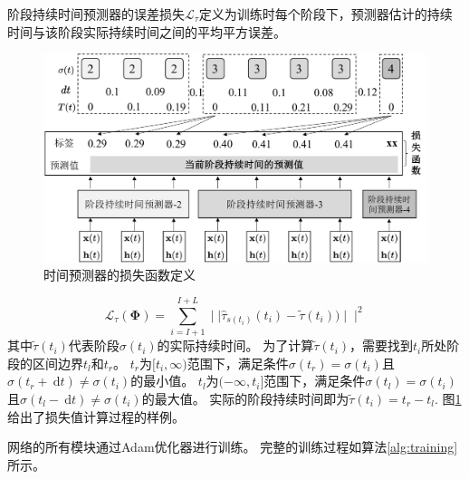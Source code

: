 阶段持续时间预测器的误差损失$\mathcal{L}_{\tau}$定义为训练时每个阶段下，预测器估计的持续时间与该阶段实际持续时间之间的平均平方误差。

\begin{figure}
    \centering
    \includegraphics[width=0.8\linewidth]{figures/chapter4/dt_label.pdf}
    \caption{时间预测器的损失函数定义}
    \label{fig:dt_label}
\end{figure}
\begin{equation}
    \mathcal{L}_{\tau}(\boldsymbol \Phi) =\sum_{i=I+1}^{I+L} \mid\mid\hat{\tau}_{s(t_i) }(t_i)-\tilde {\tau}(t_i))\mid\mid^2
\end{equation}
其中$\tilde {\tau}(t_i)$代表阶段$\sigma(t_i)$的实际持续时间。
为了计算$\tilde {\tau}(t_i)$，需要找到$t_i$所处阶段的区间边界$t_l$和$t_r$。
$t_r$为$[t_i, \infty)$范围下，满足条件$\sigma(t_r)=\sigma(t_i)$且$\sigma(t_r+\mathrm{~d}t)\neq \sigma(t_i)$的最小值。
$t_l$为$(-\infty, t_i]$范围下，满足条件$\sigma(t_l)=\sigma(t_i)$且$\sigma(t_l-\mathrm{~d}t)\neq \sigma(t_i)$的最大值。
实际的阶段持续时间即为$\tilde {\tau}(t_i)=t_r-t_l$.
图\ref{fig:dt_label}给出了损失值计算过程的样例。

网络的所有模块通过Adam优化器进行训练。
完整的训练过程如算法\ref{alg:training}所示。

